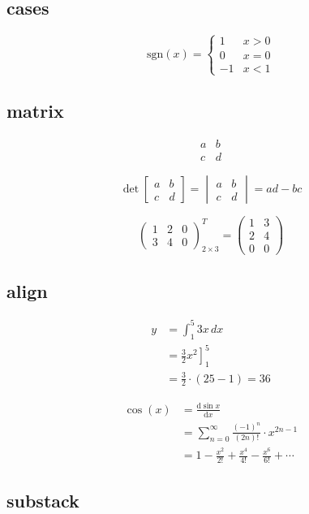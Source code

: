 \documentclass{article}
\begin{document}
\subsection{cases}

\[
\mathrm{sgn}(x) = \begin{cases}
    1 & x > 0 \\
    0 & x = 0 \\
    -1 & x < 1
\end{cases}
\]

\subsection{matrix}

\[
\begin{matrix}
    a & b \\
    c & d
\end{matrix}
\]

\[
\det\begin{bmatrix}
    a & b \\
    c & d
\end{bmatrix} = 
\begin{vmatrix}
    a & b \\
    c & d
\end{vmatrix}
= ad - bc
\]

\[
\begin{pmatrix}
    1 & 2 & 0\\
    3 & 4 & 0
\end{pmatrix}_{2\times 3}^T
=
\begin{pmatrix}
    1 & 3\\
    2 & 4\\
    0 & 0
\end{pmatrix}
\]

\subsection{align}

\begin{align}
    y &= \int_1^5 3x\, dx \\
     &= \left. \frac{3}{2}x^2 \right]_1^5 \\
     &= \frac{3}{2} \cdot (25 - 1) = 36
\end{align}

\begin{align}
    \cos(x) &= \frac{\mathrm{d}\sin x}{\mathrm{d}x} \\
     &= \sum_{n=0}^\infty \frac{(-1)^n}{(2n)!}\cdot x^{2n - 1} \\
     &= 1 - \frac{x^2}{2!} + \frac{x^4}{4!} - \frac{x^6}{6!} + \cdots
\end{align}

\subsection{substack}
\end{document}
